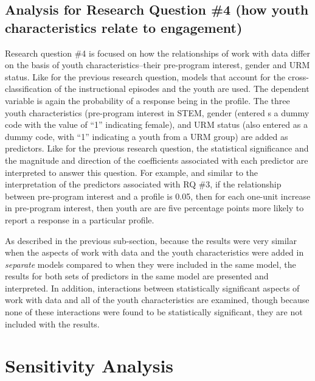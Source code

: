 \documentclass[]{msu-thesis}
\theoremstyle{definition}
\theoremstyle{definition}
\theoremstyle{definition}
\theoremstyle{remark}
\begin{document}
\subsection{Analysis for Research Question \#4 (how youth
characteristics relate to
engagement)}\label{analysis-for-research-question-4-how-youth-characteristics-relate-to-engagement}

Research question \#4 is focused on how the relationships of work with
data differ on the basis of youth characteristics--their pre-program
interest, gender and URM status. Like for the previous research
question, models that account for the cross-classification of the
instructional episodes and the youth are used. The dependent variable is
again the probability of a response being in the profile. The three
youth characteristics (pre-program interest in STEM, gender (entered s a
dummy code with the value of ``1'' indicating female), and URM status
(also entered as a dummy code, with ``1'' indicating a youth from a URM
group) are added as predictors. Like for the previous research question,
the statistical significance and the magnitude and direction of the
coefficients associated with each predictor are interpreted to answer
this question. For example, and similar to the interpretation of the
predictors associated with RQ \#3, if the relationship between
pre-program interest and a profile is 0.05, then for each one-unit
increase in pre-program interest, then youth are are five percentage
points more likely to report a response in a particular profile.

As described in the previous sub-section, because the results were very
similar when the aspects of work with data and the youth characteristics
were added in \emph{separate} models compared to when they were included
in the same model, the results for both sets of predictors in the same
model are presented and interpreted. In addition, interactions between
statistically significant aspects of work with data and all of the youth
characteristics are examined, though because none of these interactions
were found to be statistically significant, they are not included with
the results.

\section{Sensitivity Analysis}\label{sensitivity-analysis}
\end{document}
